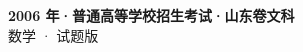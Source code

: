 \documentclass[zihao=-4, a4paper]{ctexart}
\begin{document}
\begin{center}
  {\Large\bfseries 2006 年·普通高等学校招生考试·山东卷文科}\\[4pt]
  {\large 数学 · 试题版}
\end{center}
\medskip
{}

\end{document}
